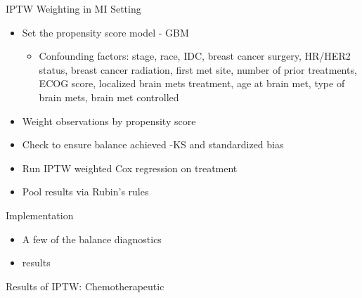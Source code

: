 \begin{frame}{IPTW Weighting in MI Setting}
\begin{itemize}
 \item Set the propensity score model - GBM
 \begin{itemize}
  \item Confounding factors: stage, race, IDC, breast cancer surgery, HR/HER2 status,
  breast cancer radiation, first met site, number of prior treatments, ECOG score,
  localized brain mets treatment, age at brain met, type of brain mets, brain met controlled
 \end{itemize}

 \item Weight observations by propensity score
 \item Check to ensure balance achieved -KS and standardized bias
 \item Run IPTW weighted Cox regression on treatment
 \item Pool results via Rubin's rules
\end{itemize} 
\end{frame}


\begin{frame}{Implementation}
 \begin{itemize}
  \item A few of the balance diagnostics
  \item results
 \end{itemize}

\end{frame}

\begin{frame}{Results of IPTW: Chemotherapeutic}
 \begin{table}[]
\centering
{}
\caption{Chemotherapeutic ATE with IPTW weights, AC and MI}

\end{table}


 
\end{frame}

